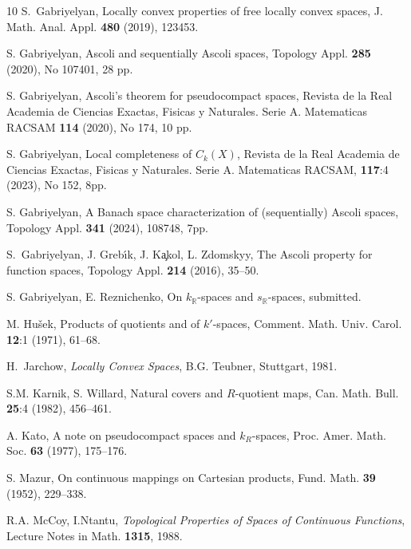 \documentclass[preprint,11pt]{elsarticle}
\numberwithin{equation}{section}
\numberwithin{theorem}{section}
\newcommand{\IR}{\mathbb{R}}
\newcommand{\CC}{C_k}
\begin{document}
\begin{thebibliography}{10}
S.~Gabriyelyan, Locally convex properties of free locally convex spaces, J. Math. Anal. Appl. \textbf{480} (2019), 123453.

S. Gabriyelyan, Ascoli and sequentially Ascoli spaces, Topology Appl. \textbf{285} (2020), No 107401, 28 pp.

S. Gabriyelyan, Ascoli's theorem for pseudocompact spaces, Revista de la Real Academia de Ciencias Exactas, Fisicas y Naturales. Serie A. Matematicas RACSAM \textbf{114} (2020), No 174, 10 pp.

S. Gabriyelyan, Local completeness of $\CC(X)$, Revista de la Real Academia de Ciencias Exactas, Fisicas y Naturales. Serie A. Matematicas RACSAM, \textbf{117}:4 (2023), No 152, 8pp.

S. Gabriyelyan, A Banach space characterization of (sequentially) Ascoli spaces, Topology Appl. \textbf{341} (2024), 108748, 7pp.

S.~Gabriyelyan, J.  Greb\'{\i}k, J. K\c{a}kol, L. Zdomskyy,  The Ascoli property for function spaces, Topology Appl. \textbf{214} (2016), 35--50.

S. Gabriyelyan, E. Reznichenko, On $k_\IR$-spaces and  $s_\IR$-spaces, submitted.

M. Hu\v{s}ek, Products of quotients and of $k'$-spaces, Comment. Math. Univ. Carol.  \textbf{12}:1 (1971), 61--68.

H.~Jarchow, \emph{Locally Convex Spaces}, B.G. Teubner, Stuttgart, 1981.


S.M. Karnik, S. Willard, Natural covers and $R$-quotient maps, Can. Math. Bull. \textbf{25}:4 (1982), 456--461.

A. Kato, A note on pseudocompact spaces and $k_R$-spaces, Proc. Amer. Math. Soc. \textbf{63}  (1977), 175--176.


S. Mazur, On continuous mappings on Cartesian products, Fund. Math. \textbf{39} (1952), 229--338.

R.A. McCoy, I.Ntantu, \emph{Topological Properties of Spaces of Continuous Functions}, Lecture Notes in Math.  \textbf{1315}, 1988.


\end{thebibliography}
\end{document}

